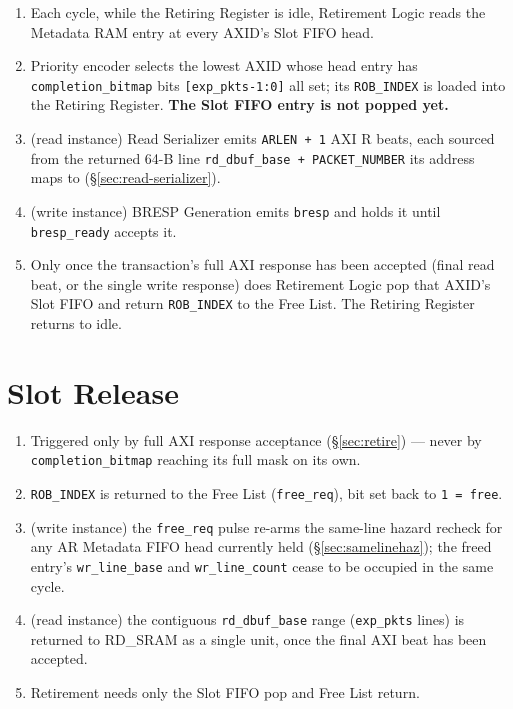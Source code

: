\begin{enumerate}[noitemsep]
  \item Each cycle, while the Retiring Register is idle, Retirement Logic reads the Metadata RAM entry at every AXID's Slot FIFO head.
  \item Priority encoder selects the lowest AXID whose head entry has \texttt{completion\_bitmap} bits \texttt{[exp\_pkts-1:0]} all set; its \texttt{ROB\_INDEX} is loaded into the Retiring Register. \textbf{The Slot FIFO entry is not popped yet.}
  \item (read instance) Read Serializer emits \texttt{ARLEN + 1} AXI R beats, each sourced from the returned 64-B line \texttt{rd\_dbuf\_base + PACKET\_NUMBER} its address maps to (\S\ref{sec:read-serializer}).
  \item (write instance) BRESP Generation emits \texttt{bresp} and holds it until \texttt{bresp\_ready} accepts it.
  \item Only once the transaction's full AXI response has been accepted (final read beat, or the single write response) does Retirement Logic pop that AXID's Slot FIFO and return \texttt{ROB\_INDEX} to the Free List. The Retiring Register returns to idle.
\end{enumerate}

\section{Slot Release}
\label{sec:release}

\begin{enumerate}[noitemsep]
  \item Triggered only by full AXI response acceptance (\S\ref{sec:retire}) --- never by \texttt{completion\_bitmap} reaching its full mask on its own.
  \item \texttt{ROB\_INDEX} is returned to the Free List (\texttt{free\_req}), bit set back to \texttt{1 = free}.
  \item (write instance) the \texttt{free\_req} pulse re-arms the same-line hazard recheck for any AR Metadata FIFO head currently held (\S\ref{sec:samelinehaz}); the freed entry's \texttt{wr\_line\_base} and \texttt{wr\_line\_count} cease to be occupied in the same cycle.
  \item (read instance) the contiguous \texttt{rd\_dbuf\_base} range (\texttt{exp\_pkts} lines) is returned to RD\_SRAM as a single unit, once the final AXI beat has been accepted.
  \item Retirement needs only the Slot FIFO pop and Free List return.
\end{enumerate}

